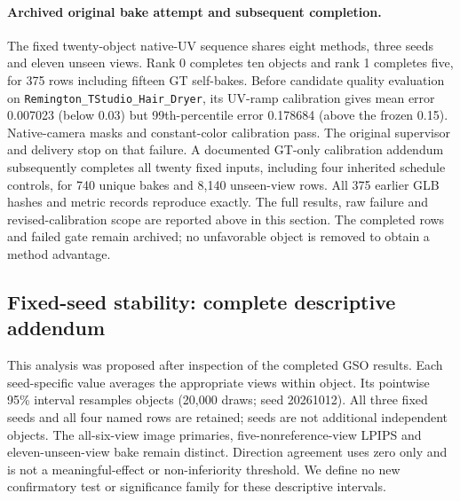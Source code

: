 \documentclass[11pt]{article}
\begin{document}
\paragraph{Archived original bake attempt and subsequent completion.}
The fixed twenty-object native-UV sequence shares eight methods, three seeds and eleven unseen views. Rank 0 completes ten objects and rank 1 completes five, for 375 rows including fifteen GT self-bakes. Before candidate quality evaluation on \texttt{Remington\_\allowbreak TStudio\_\allowbreak Hair\_\allowbreak Dryer}, its UV-ramp calibration gives mean error 0.007023 (below 0.03) but 99th-percentile error 0.178684 (above the frozen 0.15). Native-camera masks and constant-color calibration pass. The original supervisor and delivery stop on that failure. A documented GT-only calibration addendum subsequently completes all twenty fixed inputs, including four inherited schedule controls, for 740 unique bakes and 8,140 unseen-view rows. All 375 earlier GLB hashes and metric records reproduce exactly. The full results, raw failure and revised-calibration scope are reported above in this section. The completed rows and failed gate remain archived; no unfavorable object is removed to obtain a method advantage.

\FloatBarrier
\subsection*{Fixed-seed stability: complete descriptive addendum}
This analysis was proposed after inspection of the completed GSO results. Each seed-specific value averages the appropriate views within object. Its pointwise 95\% interval resamples objects (20,000 draws; seed 20261012). All three fixed seeds and all four named rows are retained; seeds are not additional independent objects. The all-six-view image primaries, five-nonreference-view LPIPS and eleven-unseen-view bake remain distinct. Direction agreement uses zero only and is not a meaningful-effect or non-inferiority threshold. We define no new confirmatory test or significance family for these descriptive intervals.
\end{document}
